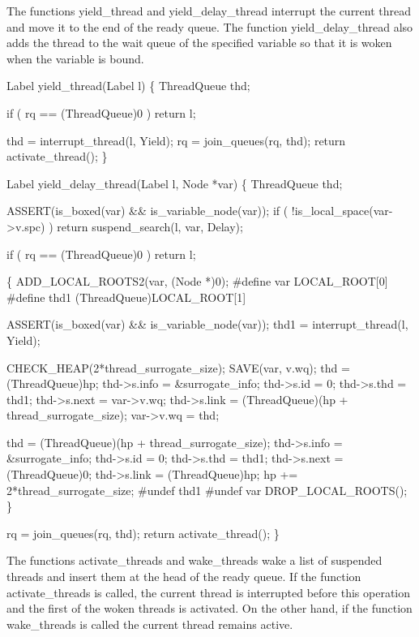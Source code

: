 \nwendcode{}\nwdocspar
The functions {\Tt{}yield{\_}thread\nwendquote} and {\Tt{}yield{\_}delay{\_}thread\nwendquote} interrupt
the current thread and move it to the end of the ready queue. The
function {\Tt{}yield{\_}delay{\_}thread\nwendquote} also adds the thread to the wait queue
of the specified variable so that it is woken when the variable is
bound.

\nwenddocs{}\plusendmoddef\nwstartdeflinemarkup{}\nwenddeflinemarkup
Label
yield_thread(Label l)
\{
    ThreadQueue thd;

    if ( rq == (ThreadQueue)0 )
        return l;

    thd = interrupt_thread(l, Yield);
    rq  = join_queues(rq, thd);
    return activate_thread();
\}

Label
yield_delay_thread(Label l, Node *var)
\{
    ThreadQueue thd;

    ASSERT(is_boxed(var) && is_variable_node(var));
    if ( !is_local_space(var->v.spc) )
        return suspend_search(l, var, Delay);

    if ( rq == (ThreadQueue)0 )
        return l;

    \{
        ADD_LOCAL_ROOTS2(var, (Node *)0);
#define var LOCAL_ROOT[0]
#define thd1 (ThreadQueue)LOCAL_ROOT[1]

        ASSERT(is_boxed(var) && is_variable_node(var));
        thd1 = interrupt_thread(l, Yield);

        CHECK_HEAP(2*thread_surrogate_size);
        SAVE(var, v.wq);
        thd         = (ThreadQueue)hp;
        thd->s.info = &surrogate_info;
        thd->s.id   = 0;
        thd->s.thd  = thd1;
        thd->s.next = var->v.wq;
        thd->s.link = (ThreadQueue)(hp + thread_surrogate_size);
        var->v.wq   = thd;

        thd         = (ThreadQueue)(hp + thread_surrogate_size);
        thd->s.info = &surrogate_info;
        thd->s.id   = 0;
        thd->s.thd  = thd1;
        thd->s.next = (ThreadQueue)0;
        thd->s.link = (ThreadQueue)hp;
        hp         += 2*thread_surrogate_size;
#undef thd1
#undef var
        DROP_LOCAL_ROOTS();
    \}

    rq  = join_queues(rq, thd);
    return activate_thread();
\}

\nwendcode{}\nwdocspar
The functions {\Tt{}activate{\_}threads\nwendquote} and {\Tt{}wake{\_}threads\nwendquote} wake a list of
suspended threads and insert them at the head of the ready queue. If
the function {\Tt{}activate{\_}threads\nwendquote} is called, the current thread is
interrupted before this operation and the first of the woken threads
is activated. On the other hand, if the function {\Tt{}wake{\_}threads\nwendquote} is
called the current thread remains active.

